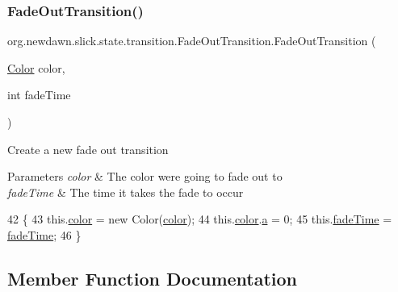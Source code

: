 \subsubsection{\texorpdfstring{Fade\+Out\+Transition()}{FadeOutTransition()}\hspace{0.1cm}{\footnotesize\ttfamily [3/3]}}
{\footnotesize\ttfamily org.\+newdawn.\+slick.\+state.\+transition.\+Fade\+Out\+Transition.\+Fade\+Out\+Transition (\begin{DoxyParamCaption}\item[{\mbox{\hyperlink{classorg_1_1newdawn_1_1slick_1_1_color}{Color}}}]{color,  }\item[{int}]{fade\+Time }\end{DoxyParamCaption})\hspace{0.3cm}{\ttfamily [inline]}}

Create a new fade out transition


\begin{DoxyParams}{Parameters}
{\em color} & The color we\textquotesingle{}re going to fade out to \\
\hline
{\em fade\+Time} & The time it takes the fade to occur \\
\hline
\end{DoxyParams}

\begin{DoxyCode}
42                                                         \{
43         this.\mbox{\hyperlink{classorg_1_1newdawn_1_1slick_1_1state_1_1transition_1_1_fade_out_transition_a71c42f67f13c8572900a197aef96aa90}{color}} = \textcolor{keyword}{new} Color(\mbox{\hyperlink{classorg_1_1newdawn_1_1slick_1_1state_1_1transition_1_1_fade_out_transition_a71c42f67f13c8572900a197aef96aa90}{color}});
44         this.\mbox{\hyperlink{classorg_1_1newdawn_1_1slick_1_1state_1_1transition_1_1_fade_out_transition_a71c42f67f13c8572900a197aef96aa90}{color}}.\mbox{\hyperlink{classorg_1_1newdawn_1_1slick_1_1_color_ab9288c822ff7614a77c887eb8c2595a7}{a}} = 0;
45         this.\mbox{\hyperlink{classorg_1_1newdawn_1_1slick_1_1state_1_1transition_1_1_fade_out_transition_ad34428b2e0502b887e293c1db61fe979}{fadeTime}} = \mbox{\hyperlink{classorg_1_1newdawn_1_1slick_1_1state_1_1transition_1_1_fade_out_transition_ad34428b2e0502b887e293c1db61fe979}{fadeTime}};
46     \}
\end{DoxyCode}


\subsection{Member Function Documentation}
\mbox{\label{classorg_1_1newdawn_1_1slick_1_1state_1_1transition_1_1_fade_out_transition_aaf4f47fa4c7b06de675aa1c75f1c0f19}} 
